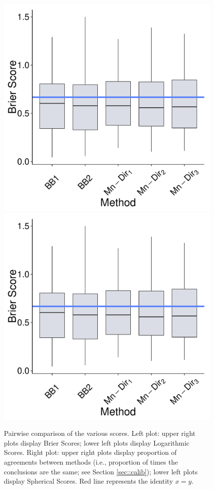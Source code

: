 \documentclass[journal,article,accept,moreauthors,pdftex,12pt,a4paper]{mdpi}
\begin{document}
		
			\begin{figure}[H]
				\centering
				\includegraphics[page=13,scale=0.48]{futebolComparacaoModelosForPaper.pdf}
				\includegraphics[page=14,scale=0.48]{futebolComparacaoModelosForPaper.pdf}\\
				\caption{Pairwise comparison of the various scores. Left plot: upper right plots display Brier Scores;
				lower left plots display Logarithmic Scores. Right plot: upper right plots display proportion of agreements
				between methods (i.e., proportion of times the conclusions are the same; see Section \ref{sec::calib}); lower left  plots display Spherical Scores. Red line represents the identity $x=y$.}
				\label{fig::scores2}
			\end{figure}
		
\end{document}

